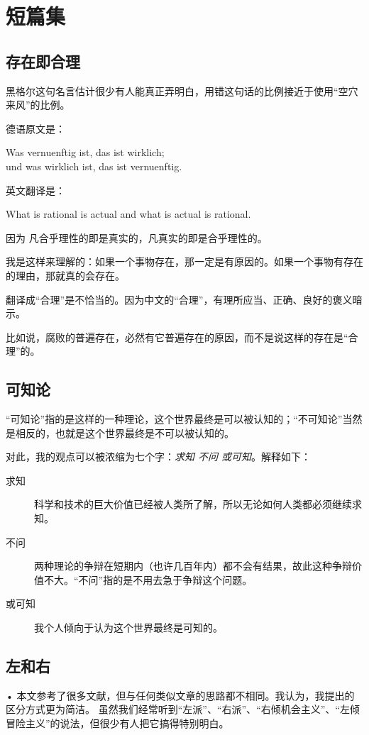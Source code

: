 \chapter{短篇集}

\section{存在即合理}
黑格尔这句名言估计很少有人能真正弄明白，用错这句话的比例接近于使用“空穴来风”的比例。

德语原文是：
\begin{quoting}
Was vernuenftig ist, das ist wirklich;\\
und was wirklich ist, das ist vernuenftig.
\end{quoting}

英文翻译是：
\begin{quoting}
What is rational is actual and what is actual is rational. 
\end{quoting}

因为
凡合乎理性的即是真实的，凡真实的即是合乎理性的。

我是这样来理解的：如果一个事物存在，那一定是有原因的。如果一个事物有存在的理由，那就真的会存在。

翻译成“合理”是不恰当的。因为中文的“合理”，有理所应当、正确、良好的褒义暗示。

比如说，腐败的普遍存在，必然有它普遍存在的原因，而不是说这样的存在是“合理”的。

\section{可知论}
“可知论”指的是这样的一种理论，这个世界最终是可以被认知的；“不可知论”当然是相反的，也就是这个世界最终是不可以被认知的。

对此，我的观点可以被浓缩为七个字：\emph{求知 不问 或可知}。解释如下：
\begin{description}
\item[求知] 科学和技术的巨大价值已经被人类所了解，所以无论如何人类都必须继续求知。
\item[不问] 两种理论的争辩在短期内（也许几百年内）都不会有结果，故此这种争辩价值不大。“不问”指的是不用去急于争辩这个问题。
\item[或可知] 我个人倾向于认为这个世界最终是可知的。
\end{description}


\section{左和右}
•	本文参考了很多文献，但与任何类似文章的思路都不相同。我认为，我提出的区分方式更为简洁。
	虽然我们经常听到“左派”、“右派”、“右倾机会主义”、“左倾冒险主义”的说法，但很少有人把它搞得特别明白。

